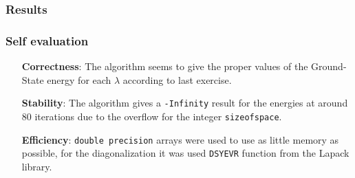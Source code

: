 \documentclass[pt12]{beamer}
\begin{document}
\begin{frame}[fragile,label=Results]
	\frametitle{Results}
	\begin{figure}[h]
		
	\end{figure}
\begin{figure}[h]
	\hspace*{-1.5 cm}
\end{figure}
\end{frame}

\begin{frame}[fragile,label=Self evaluation]
	\frametitle{Self evaluation}
	\begin{enumerate}[leftmargin=2cm]
		\item[\textbf{\color{PDred}Correctness}: ] The algorithm seems to give the proper values of the Ground-State energy for each $\lambda$ according to last exercise.
		\item[\textbf{\color{PDred}Stability}: ] The algorithm gives a \texttt{-Infinity} result for the energies at around 80 iterations due to the overflow for the integer \texttt{sizeofspace}.
		\item[\textbf{\color{PDred}Efficiency}: ] \texttt{double precision} arrays were used to use as little memory as possible, for the diagonalization it was used \texttt{DSYEVR} function from the Lapack library.
	\end{enumerate}
\end{frame}


\end{document}
